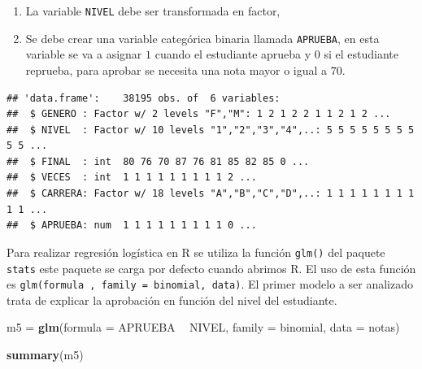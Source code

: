 \documentclass[letterpaper,]{book}
\newenvironment{Shaded}{\begin{snugshade}}{\end{snugshade}}
\newcommand{\DataTypeTok}[1]{\textcolor[rgb]{0.13,0.29,0.53}{#1}}
\newcommand{\DecValTok}[1]{\textcolor[rgb]{0.00,0.00,0.81}{#1}}
\newcommand{\KeywordTok}[1]{\textcolor[rgb]{0.13,0.29,0.53}{\textbf{#1}}}
\newcommand{\NormalTok}[1]{#1}
\newcommand{\OperatorTok}[1]{\textcolor[rgb]{0.81,0.36,0.00}{\textbf{#1}}}
\newcommand{\StringTok}[1]{\textcolor[rgb]{0.31,0.60,0.02}{#1}}
\providecommand{\tightlist}{%
  \setlength{\itemsep}{0pt}\setlength{\parskip}{0pt}}
\begin{document}
\begin{enumerate}
\def\labelenumi{\arabic{enumi}.}
\tightlist
\item
  La variable \texttt{NIVEL} debe ser transformada en factor,
\item
  Se debe crear una variable categórica binaria llamada \texttt{APRUEBA}, en esta variable se va a asignar \(1\) cuando el estudiante aprueba y \(0\) si el estudiante reprueba, para aprobar se necesita una nota mayor o igual a \(70\).
\end{enumerate}

\begin{Shaded}
\end{Shaded}

\begin{verbatim}
## 'data.frame':    38195 obs. of  6 variables:
##  $ GENERO : Factor w/ 2 levels "F","M": 1 2 1 2 2 1 1 2 1 2 ...
##  $ NIVEL  : Factor w/ 10 levels "1","2","3","4",..: 5 5 5 5 5 5 5 5 5 5 ...
##  $ FINAL  : int  80 76 70 87 76 81 85 82 85 0 ...
##  $ VECES  : int  1 1 1 1 1 1 1 1 1 2 ...
##  $ CARRERA: Factor w/ 18 levels "A","B","C","D",..: 1 1 1 1 1 1 1 1 1 1 ...
##  $ APRUEBA: num  1 1 1 1 1 1 1 1 1 0 ...
\end{verbatim}

Para realizar regresión logística en R se utiliza la función \texttt{glm()} del paquete \texttt{stats} este paquete se carga por defecto cuando abrimos R. El uso de esta función es \texttt{glm(formula\ ,\ family\ =\ binomial,\ data)}. El primer modelo a ser analizado trata de explicar la aprobación en función del nivel del estudiante.

\begin{Shaded}
\begin{Highlighting}[]
\NormalTok{m5 =}\StringTok{ }\KeywordTok{glm}\NormalTok{(}\DataTypeTok{formula =}\NormalTok{ APRUEBA }\OperatorTok{~}\StringTok{ }\NormalTok{NIVEL, }\DataTypeTok{family =}\NormalTok{ binomial, }\DataTypeTok{data =}\NormalTok{ notas)}

\KeywordTok{summary}\NormalTok{(m5)}
\end{Highlighting}
\end{Shaded}
\end{document}
